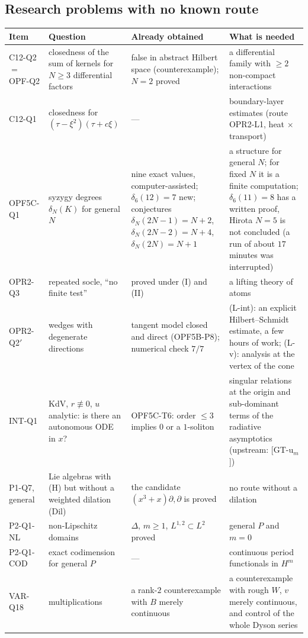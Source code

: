 \documentclass[11pt]{article}
\theoremstyle{plain}
\theoremstyle{definition}
\theoremstyle{remark}
\begin{document}
\subsection{Research problems with no known route}

\begin{center}\small
\begin{longtable}{@{}L{2.5cm}L{4.0cm}L{4.2cm}L{4.0cm}@{}}
\toprule
Item & Question & Already obtained & What is needed\\\midrule\endhead
C12-Q2 $=$ OPF-Q2 & closedness of the sum of kernels for $N\ge3$ differential factors & false in abstract Hilbert space (counterexample); $N=2$ proved & a differential family with $\ge2$ non-compact interactions\\
C12-Q1 & closedness for $(\tau-\xi^2)(\tau+c\xi)$ & --- & boundary-layer estimates (route OPR2-L1, heat $\times$ transport)\\
OPF5C-Q1 & syzygy degrees $\delta_N(K)$ for general $N$ & nine exact values, computer-assisted; $\delta_6(12)=7$ new; conjectures $\delta_N(2N-1)=N+2$, $\delta_N(2N-2)=N+4$, $\delta_N(2N)=N+1$ & a structure for general $N$; for fixed $N$ it is a finite computation; $\delta_6(11)=8$ has a written proof, Hirota $N=5$ is not concluded (a run of about $17$ minutes was interrupted)\\
OPR2-Q3 & repeated socle, ``no finite test'' & proved under (I) and (II) & a lifting theory of atoms\\
OPR2-Q2$'$ & wedges with degenerate directions & tangent model closed and direct (OPF5B-P8); numerical check $7/7$ & (L-int): an explicit Hilbert--Schmidt estimate, a few hours of work; (L-v): analysis at the vertex of the cone\\
INT-Q1 & KdV, $r\not\equiv0$, $u$ analytic: is there an autonomous ODE in $x$? & OPF5C-T6: order $\le3$ implies $0$ or a $1$-soliton & singular relations at the origin and sub-dominant terms of the radiative asymptotics (upstream: [GT-u$_m$])\\
P1-Q7, general & Lie algebras with (H) but without a weighted dilation (Dil) & the candidate $(x^3+x)\partial,\partial$ is proved & no route without a dilation\\
P2-Q1-NL & non-Lipschitz domains & $\Delta$, $m\ge1$, $L^{1,2}\subset L^2$ proved & general $P$ and $m=0$\\
P2-Q1-COD & exact codimension for general $P$ & --- & continuous period functionals in $H^m$\\
VAR-Q18 & multiplications & a rank-$2$ counterexample with $B$ merely continuous & a counterexample with rough $W$, $v$ merely continuous, and control of the whole Dyson series\\

\end{longtable}
\end{center}
\end{document}
